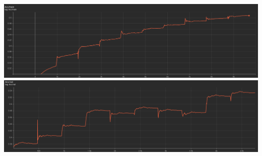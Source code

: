 \documentclass{article}
\begin{document}
\includegraphics[width=\textwidth]{q2.6_3.png}
\includegraphics[width=\textwidth]{q2.6_4.png}
\end{document}
